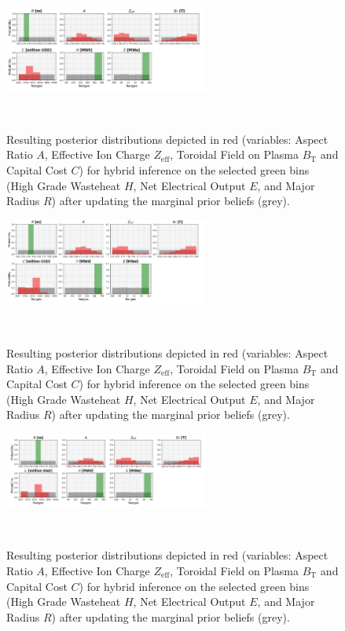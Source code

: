 \begin{figure}[ht]
    \centering
    \includegraphics[width=0.6\textwidth]{figures/TE_results/march_data/config(57)_outputs(3)_hybrid_3.png}
    \caption{Resulting posterior distributions depicted in red (variables: Aspect Ratio $A$, Effective Ion Charge $Z_{\text{eff}}$, Toroidal Field on Plasma $B_{\text{T}}$ and Capital Cost $C$) for hybrid
    inference on the selected green bins (High Grade Wasteheat $H$, Net Electrical Output $E$, and Major Radius $R$) after updating the marginal prior beliefs (grey).}~\label{fig:config(57)_outputs(3)_hybrid_3}
\end{figure}

\begin{figure}[ht]
    \centering
    \includegraphics[width=0.6\textwidth]{figures/TE_results/march_data/config(57)_outputs(3)_hybrid4.png}
    \caption{Resulting posterior distributions depicted in red (variables: Aspect Ratio $A$, Effective Ion Charge $Z_{\text{eff}}$, Toroidal Field on Plasma $B_{\text{T}}$ and Capital Cost $C$) for hybrid
    inference on the selected green bins (High Grade Wasteheat $H$, Net Electrical Output $E$, and Major Radius $R$) after updating the marginal prior beliefs (grey).}~\label{fig:config(57)_outputs(3)_hybrid4}
\end{figure}

\begin{figure}[ht]
    \centering
    \includegraphics[width=0.6\textwidth]{figures/TE_results/march_data/config(57)_outputs(3)_hybrid5.png}
    \caption{Resulting posterior distributions depicted in red (variables: Aspect Ratio $A$, Effective Ion Charge $Z_{\text{eff}}$, Toroidal Field on Plasma $B_{\text{T}}$ and Capital Cost $C$) for hybrid
    inference on the selected green bins (High Grade Wasteheat $H$, Net Electrical Output $E$, and Major Radius $R$) after updating the marginal prior beliefs (grey).}~\label{fig:config(57)_outputs(3)_hybrid5}
\end{figure}

